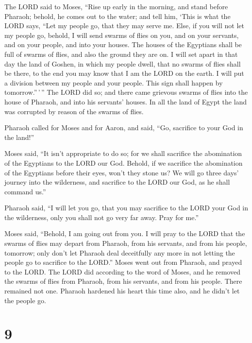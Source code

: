  The LORD said to Moses, ``Rise up early in the morning,
and stand before Pharaoh; behold, he comes out to the water; and tell
him, `This is what the LORD says, ``Let my people go, that they may
serve me.  Else, if you will not let my people go,
behold, I will send swarms of flies on you, and on your servants, and on
your people, and into your houses. The houses of the Egyptians shall be
full of swarms of flies, and also the ground they are on.
 I will set apart in that day the land of Goshen, in
which my people dwell, that no swarms of flies shall be there, to the
end you may know that I am the LORD on the earth.  I will
put a division between my people and your people. This sign shall happen
by tomorrow.''\,'\,''  The LORD did so; and there came
grievous swarms of flies into the house of Pharaoh, and into his
servants' houses. In all the land of Egypt the land was corrupted by
reason of the swarms of flies.

 Pharaoh called for Moses and for Aaron, and said, ``Go,
sacrifice to your God in the land!''

 Moses said, ``It isn't appropriate to do so; for we
shall sacrifice the abomination of the Egyptians to the LORD our God.
Behold, if we sacrifice the abomination of the Egyptians before their
eyes, won't they stone us?  We will go three days'
journey into the wilderness, and sacrifice to the LORD our God, as he
shall command us.''

 Pharaoh said, ``I will let you go, that you may
sacrifice to the LORD your God in the wilderness, only you shall not go
very far away. Pray for me.''

 Moses said, ``Behold, I am going out from you. I will
pray to the LORD that the swarms of flies may depart from Pharaoh, from
his servants, and from his people, tomorrow; only don't let Pharaoh deal
deceitfully any more in not letting the people go to sacrifice to the
LORD.''  Moses went out from Pharaoh, and prayed to the
LORD.  The LORD did according to the word of Moses, and
he removed the swarms of flies from Pharaoh, from his servants, and from
his people. There remained not one.  Pharaoh hardened his
heart this time also, and he didn't let the people go.

\hypertarget{section-8}{%
\section{9}\label{section-8}}

